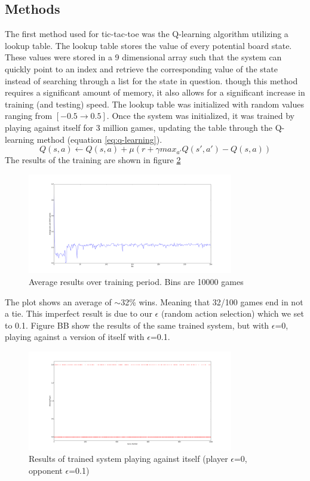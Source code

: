 \documentclass[12pt,a4paper]{article}
\begin{document}
\subsection*{Methods}
The first method used for tic-tac-toe was the Q-learning algorithm utilizing a lookup table. The lookup table stores the value of every potential board state. These values were stored in a 9 dimensional array such that the system can quickly point to an index and retrieve the corresponding value of the state instead of searching through a list for the state in question. though this method requires a significant amount of memory, it also allows for a significant increase in training (and testing) speed. The lookup table was initialized with random values ranging from $[-0.5 \rightarrow 0.5]$. Once the system was initialized, it was trained by playing against itself for 3 million games, updating the table through the Q-learning method (equation \ref{eq:q-learning}). 
\begin{equation}
{Q(s,a)} \leftarrow {Q(s,a) + \mu(r + \gamma max_{a'}Q(s',a')-Q(s,a))}
\label{eq:q-learning}
\end{equation}
The results of the training are shown in figure \ref{fig:training}
\begin{figure}[h]
\centering
\includegraphics[width=0.8\textwidth]{figures/train01epsilon.png}
\caption{Average results over training period. Bins are 10000 games}
\label{fig:training}
\end{figure}
The plot shows an average of $\sim$32\% wins. Meaning that 32/100 games end in not a tie. This imperfect result is due to our $\epsilon$ (random action selection) which we set to 0.1. Figure BB show the results of the same trained system, but with $\epsilon$=0, playing against a version of itself with $\epsilon$=0.1.
\begin{figure}[h]
\centering
\includegraphics[width=0.8\textwidth]{figures/Optimalstateresults.png}
\caption{Results of trained system playing against itself (player $\epsilon$=0, opponent $\epsilon$=0.1)}
\label{fig:training}
\end{figure}
\end{document}
